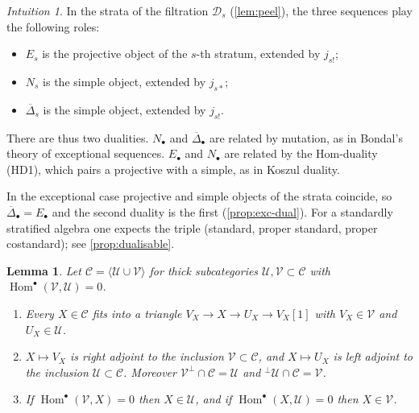 \documentclass[11pt,reqno]{amsart}
\theoremstyle{plain}
\newtheorem{lemma}[theorem]{Lemma}
\theoremstyle{definition}
\theoremstyle{remark}
\newtheorem*{intuition}{Intuition}
\DeclareMathOperator{\Hom}{Hom}
\newcommand{\thick}[1]{\langle #1\rangle}
\newcommand{\Deltabar}{\overline{\Delta}}
\newcommand{\cD}{\mathcal{D}}
\newcommand{\cC}{\mathcal{C}}
\newcommand{\cU}{\mathcal{U}}
\newcommand{\cV}{\mathcal{V}}
\begin{document}
\begin{intuition}
In the strata of the filtration $\cD_s$ (\cref{lem:peel}), the three sequences play the following roles:
\begin{itemize}
\item $E_s$ is the projective object of the $s$-th stratum, extended by $j_{s!}$;
\item $N_s$ is the simple object, extended by $j_{s*}$;
\item $\Deltabar_s$ is the simple object, extended by $j_{s!}$.
\end{itemize}
There are thus two dualities. $N_\bullet$ and $\Deltabar_\bullet$ are related by mutation, as in Bondal's theory of exceptional sequences. $E_\bullet$ and $N_\bullet$ are related by the Hom-duality (HD1), which pairs a projective with a simple, as in Koszul duality.

In the exceptional case projective and simple objects of the strata coincide, so $\Deltabar_\bullet=E_\bullet$ and the second duality is the first (\cref{prop:exc-dual}). For a standardly stratified algebra one expects the triple (standard, proper standard, proper costandard); see \cref{prop:dualisable}.
\end{intuition}


\begin{lemma}\label{lem:sod}
Let $\cC=\thick{\cU\cup\cV}$ for thick subcategories $\cU,\cV\subset\cC$ with $\Hom^\bullet(\cV,\cU)=0$.
\begin{enumerate}
\item Every $X\in\cC$ fits into a triangle $V_X\to X\to U_X\to V_X[1]$ with $V_X\in\cV$ and $U_X\in\cU$.
\item $X\mapsto V_X$ is right adjoint to the inclusion $\cV\subset\cC$, and $X\mapsto U_X$ is left adjoint to the inclusion $\cU\subset\cC$. Moreover $\cV^\perp\cap\cC=\cU$ and ${}^\perp\cU\cap\cC=\cV$.
\item If $\Hom^\bullet(\cV,X)=0$ then $X\in\cU$, and if $\Hom^\bullet(X,\cU)=0$ then $X\in\cV$.
\end{enumerate}
\end{lemma}
\end{document}
